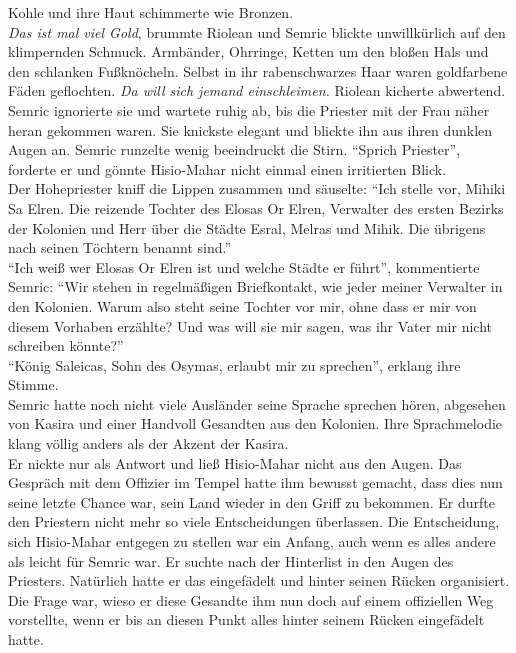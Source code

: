 Kohle und ihre Haut schimmerte wie Bronzen.\\
\textit{Das ist mal viel Gold}, brummte Riolean und Semric blickte unwillkürlich auf den 
klimpernden Schmuck. Armbänder, Ohrringe, Ketten um den bloßen Hals und den schlanken Fußknöcheln. 
Selbst in ihr rabenschwarzes Haar waren goldfarbene Fäden geflochten. \textit{Da will sich jemand 
einschleimen.} Riolean kicherte abwertend.\\
Semric ignorierte sie und wartete ruhig ab, bis die Priester mit der Frau näher heran gekommen 
waren. Sie knickste elegant und blickte ihn aus ihren dunklen Augen an. Semric runzelte wenig 
beeindruckt die Stirn. ``Sprich Priester'', forderte er und gönnte Hisio-Mahar nicht einmal einen 
irritierten Blick.\\
Der Hohepriester kniff die Lippen zusammen und säuselte: ``Ich stelle vor, Mihiki Sa Elren. Die 
reizende Tochter des Elosas Or Elren, Verwalter des ersten Bezirks der Kolonien und Herr über die 
Städte Esral, Melras und Mihik. Die übrigens nach seinen Töchtern benannt sind.''\\
``Ich weiß wer Elosas Or Elren ist und welche Städte er führt'', kommentierte Semric: ``Wir stehen 
in regelmäßigen Briefkontakt, wie jeder meiner Verwalter in den Kolonien. Warum also steht seine 
Tochter vor mir, ohne dass er mir von diesem Vorhaben erzählte? Und was will sie mir sagen, was ihr 
Vater mir nicht schreiben könnte?''\\
``König Saleicas, Sohn des Osymas, erlaubt mir zu sprechen'', erklang ihre Stimme.\\
Semric hatte noch nicht viele Ausländer seine Sprache sprechen hören, abgesehen von Kasira und 
einer Handvoll Gesandten aus den Kolonien. Ihre Sprachmelodie klang völlig anders als der Akzent 
der Kasira.\\
Er nickte nur als Antwort und ließ Hisio-Mahar nicht aus den Augen. Das Gespräch mit dem Offizier 
im Tempel hatte ihm bewusst gemacht, dass dies nun seine letzte Chance war, sein Land wieder in den 
Griff zu bekommen. Er durfte den Priestern nicht mehr so viele Entscheidungen überlassen. Die 
Entscheidung, sich Hisio-Mahar entgegen zu stellen war ein Anfang, auch wenn es alles andere als 
leicht für Semric war. Er suchte nach der Hinterlist in den Augen des Priesters. Natürlich hatte er 
das eingefädelt und hinter seinen Rücken organisiert. Die Frage war, wieso er diese Gesandte ihm 
nun doch auf einem offiziellen Weg vorstellte, wenn er bis an diesen Punkt alles hinter seinem 
Rücken eingefädelt hatte.\\
